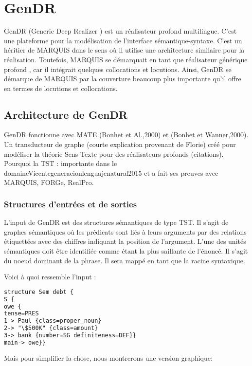 
\chapter{GenDR}

GenDR (Generic Deep Realizer \citep{lareau18}) est un réalisateur profond multilingue. C'est une plateforme pour la modélisation de l'interface sémantique-syntaxe. C'est un héritier de MARQUIS dans le sens où il utilise une architecture similaire pour la réalisation. Toutefois, MARQUIS se démarquait en tant que réalisateur générique profond \citep{LambreyImplementationcollocationspour2017},\citep{lareau18}  car il intégrait quelques collocations et locutions. Ainsi, GenDR se démarque de MARQUIS par la couverture beaucoup plus importante qu'il offre en termes de locutions et collocations.

\section{Architecture de GenDR}
GenDR fonctionne avec MATE (Bonhet et Al.,2000) et (Bonhet et Wanner,2000). Un transducteur de graphe (courte explication provenant de Florie) créé pour modéliser la théorie Sens-Texte pour des réalisateurs profonds (citations). Pourquoi la TST : importante dans le domaine{Vicentegeneracionlenguajenatural2015} et a fait ses preuves avec MARQUIS, FORGe, RealPro.

\subsection{Structures d'entrées et de sorties}\label{entree-sortie}
L'input de GenDR est des structures sémantiques de type TST. Il s'agit de graphes sémantiques où les prédicats sont liés à leurs arguments par des relations étiquettées avec des chiffres indiquant la position de l'argument. L'une des unités sémantiques doit être identifiée comme étant la plus saillante de l'énoncé. Il s'agit du noeud dominant de la phrase. Il sera mappé en tant que la racine syntaxique.

Voici à quoi ressemble l'input :
\begin{lstlisting}[language=XML, caption = Input sémantique, label=input]
structure Sem debt {
S {
owe {
tense=PRES
1-> Paul {class=proper_noun}
2-> "\$500K" {class=amount}
3-> bank {number=SG definiteness=DEF}}
main-> owe}}
\end{lstlisting}

Mais pour simplifier la chose, nous montrerons une version graphique:

